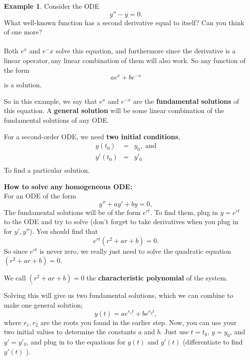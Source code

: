 \documentclass[a5paper]{article}
\theoremstyle{definition}%
\newtheorem*{example*}{Example}
\numberwithin{exercise}{section}
\theoremstyle{remark}%
\begin{document}
\begin{example*}
Consider the ODE
\[y''-y=0.\]
What well-known function has a second derivative equal to itself? Can you think of one more?\\
\\
Both $e^x$ and $e^-x$ solve this equation, and furthermore since the derivative is a linear operator,\footnotemark\,any linear combination of them will also work. So any function of the form
\[ae^x+be^{-x}\]
is a solution. 

\begin{highlight}
So in this example, we say that $e^x$ and $e^{-x}$ are the \textbf{fundamental solutions} of this equation. A \textbf{general solution} will be some linear combination of the fundamental solutions of any ODE. 
\end{highlight}

\pagebreak
\begin{highlight}
For a second-order ODE, we need \textbf{two initial conditions}, 
\[\begin{array}{rcl}
y(t_0)&=&y_0, \, \, \text{and}\\
y'(t_0)&=&y'_0\\
\end{array}\]
To find a particular solution. 
\end{highlight}


\noindent\textbf{How to solve any homogeneous ODE:}\\
For an ODE of the form 
\[y''+ay'+by=0,\]
The fundamental solutions will be of the form $e^{rt}$. To find them, plug in $y=e^{rt}$ to the ODE and try to solve (don't forget to take derivatives when you plug in for $y', y''$). You should find that 
\[e^{rt}(r^2+ar+b)=0.\]
So since $e^{rt}$ is never zero, we really just need to solve the quadratic equation $(r^2+ar+b)=0$. 
\begin{highlight}
We call $(r^2+ar+b)=0$ the \textbf{characteristic polynomial} of the system. 
\end{highlight}
Solving this will give us two fundamental solutions, which we can combine to make one general solution; 
\[y(t)=ae^{r_1t}+be^{r_2t},\]
where $r_1, r_2$ are the roots you found in the earlier step. Now, you can use your two initial values to determine the constants $a$ and $b$. Just use $t=t_0$, $y=y_0$, and $y'=y'_0$, and plug in to the equations for $y(t)$ and $y'(t)$ (differentiate to find $y'(t)$ ).


\end{example*}
\end{document}
